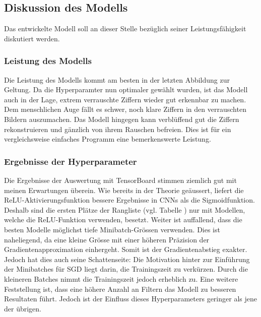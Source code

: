 \subsection{Diskussion des Modells}
Das entwickelte Modell soll an dieser Stelle bezüglich seiner Leistungsfähigkeit
diskutiert werden.

\subsubsection{Leistung des Modells}
Die Leistung des Modells kommt am besten in der letzten Abbildung zur
Geltung. Da die Hyperparamter nun optimaler gewählt wurden, ist das Modell auch
in der Lage, extrem verrauschte Ziffern wieder gut erkennbar zu machen. Dem
menschlichen Auge fällt es schwer, noch klare Ziffern in den verrauschten Bildern
auszumachen. Das Modell hingegen kann verblüffend gut die Ziffern rekonstruieren
und gänzlich von ihrem Rauschen befreien. Dies ist für ein vergleichsweise
einfaches Programm eine bemerkenswerte Leistung.

\subsubsection{Ergebnisse der Hyperparameter}
Die Ergebnisse der Auswertung mit TensorBoard stimmen ziemlich gut mit meinen
Erwartungen überein. Wie bereits in der Theorie geäussert, liefert die
ReLU-Aktivierungsfunktion bessere Ergebnisse in CNNs als die Sigmoidfunktion.
Deshalb sind die ersten Plätze der Rangliste (vgl. Tabelle ) nur mit Modellen, welche die
ReLU-Funktion verwenden, besetzt. Weiter ist auffallend, dass die besten Modelle
möglichst tiefe Minibatch-Grössen verwenden. Dies ist naheliegend, da eine
kleine Grösse mit einer höheren Präzision der Gradientenapproximation
einhergeht. Somit ist der Gradientenabstieg exakter. Jedoch hat dies auch seine
Schattenseite: Die Motivation hinter zur Einführung der
Minibatches für SGD liegt darin, die Trainingszeit zu verkürzen. Durch die
kleineren Batches nimmt die Trainingszeit jedoch erheblich zu.
Eine weitere Feststellung ist, dass eine höhere Anzahl an Filtern das Modell zu
besseren Resultaten führt. Jedoch ist der Einfluss dieses Hyperparameters
geringer als jene der übrigen.

